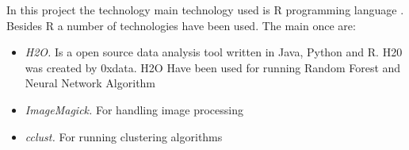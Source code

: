 In this project the technology main technology used is R programming language \cite{RLanguage}.
Besides R a number of technologies have been used. The main once are:
\begin{itemize}
\item \textit{H2O.} Is a open source data analysis tool written in Java, Python and R. H20 was created by 0xdata. H2O Have been used for running Random Forest  and Neural Network Algorithm \cite{H2O}
\item \textit{ImageMagick.} For handling image processing \cite{ImgMag}
\item \textit{cclust.} For running clustering algorithms \cite{cclust}
\end{itemize}
